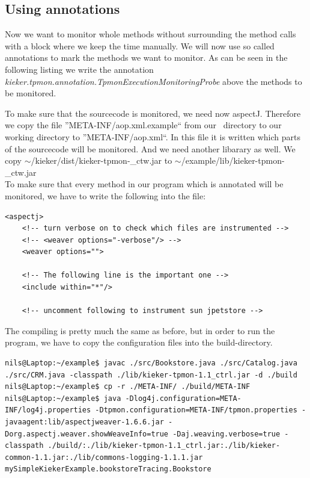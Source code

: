 \documentclass[a4paper, oneside, 11pt]{scrartcl}
\begin{document}
\subsection{Using annotations}
Now we want to monitor whole methods without surrounding the method calls with a block where we keep the time manually. We will now use so called annotations to mark the methods we want to monitor. As can be seen in the following listing we write the annotation \textit{kieker.tpmon.annotation.TpmonExecutionMonitoringProbe} above the methods to be monitored. 
\setJavaCodeListing
\lstset{caption=Bookstore.java, label=listing:Bookstore2.java}

To make sure that the sourcecode is monitored, we need now aspectJ. Therefore we copy the file ''META-INF/aop.xml.example`` from our \Kieker\ directory to our working directory to ''META-INF/aop.xml``. In this file it is written which parts of the sourcecode will be monitored.  And we need another libarary as well. We copy $\sim$/kieker/dist/kieker-tpmon-\version\_ctw.jar to $\sim$/example/lib/kieker-tpmon-\version\_ctw.jar\\
To make sure that every method in our program which is annotated will be monitored, we have to write the following into the file:
\setXMLListing 
\begin{lstlisting}
<aspectj>
	<!-- turn verbose on to check which files are instrumented -->
	<!-- <weaver options="-verbose"/> -->
	<weaver options="">
	
	<!-- The following line is the important one -->
	<include within="*"/> 

	<!-- uncomment following to instrument sun jpetstore -->
\end{lstlisting}
The compiling is pretty much the same as before, but in order to run the program, we have to copy the configuration files into the build-directory.
\begin{lstlisting}
nils@Laptop:~/example$ javac ./src/Bookstore.java ./src/Catalog.java ./src/CRM.java -classpath ./lib/kieker-tpmon-1.1_ctrl.jar -d ./build
nils@Laptop:~/example$ cp -r ./META-INF/ ./build/META-INF
nils@Laptop:~/example$ java -Dlog4j.configuration=META-INF/log4j.properties -Dtpmon.configuration=META-INF/tpmon.properties -javaagent:lib/aspectjweaver-1.6.6.jar -Dorg.aspectj.weaver.showWeaveInfo=true -Daj.weaving.verbose=true -classpath ./build/:./lib/kieker-tpmon-1.1_ctrl.jar:./lib/kieker-common-1.1.jar:./lib/commons-logging-1.1.1.jar mySimpleKiekerExample.bookstoreTracing.Bookstore
\end{lstlisting}
\end{document}
